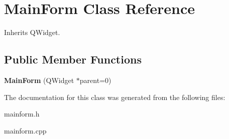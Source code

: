 \hypertarget{class_main_form}{}\section{Main\+Form Class Reference}
\label{class_main_form}


Inherits Q\+Widget.

\subsection*{Public Member Functions}
\begin{DoxyCompactItemize}
\item 
\hypertarget{class_main_form_a8407ed1ab0a7b7bef115711157c8f344}{}{\bfseries Main\+Form} (Q\+Widget $\ast$parent=0)\label{class_main_form_a8407ed1ab0a7b7bef115711157c8f344}

\end{DoxyCompactItemize}


The documentation for this class was generated from the following files\+:\begin{DoxyCompactItemize}
\item 
mainform.\+h\item 
mainform.\+cpp\end{DoxyCompactItemize}
